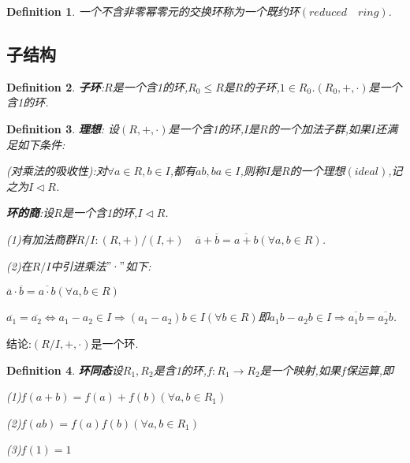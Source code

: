 \documentclass[UTF8]{article}
\newtheorem{defn}{Definition}[section]
\begin{document}
\begin{defn}
	一个不含非零幂零元的交换环称为一个既约环$(reduced\quad ring)$.
\end{defn}

\subsection{子结构}
\normalsize
\begin{defn}
	\textbf{子环}:$R$是一个含1的环,$R_0\leq R$是$R$的子环,$1\in R_0$.$(R_0,+,\cdot)$是一个含1的环.
\end{defn}


\begin{defn}
	\textbf{理想}:
	设$(R,+,\cdot)$是一个含1的环,$I$是$R$的一个加法子群,如果$I$还满足如下条件:
	
	(对乘法的吸收性):对$\forall a\in R,b\in I$,都有$ab,ba\in I$,则称$I$是$R$的一个理想$(ideal)$,记之为$I\lhd R$.
	
	\textbf{环的商}:设$R$是一个含1的环,$I\lhd R$.
	
	(1)有加法商群$R/I:(R,+)/(I,+)\quad \overline a+\overline b=\overline {a+b}(\forall a,b\in R)$.
	
	(2)在$R/I$中引进乘法$"\cdot"$如下:
	\begin{center}
		$\overline a\cdot \overline b=\overline {a\cdot b}(\forall a,b\in R)$
		
		$\overline{a_1}=\overline{a_2}\iff a_1-a_2\in I\Rightarrow (a_1-a_2)b\in I(\forall b\in R)$即$a_1b-a_2b\in I\Rightarrow\overline{a_1b}=\overline{a_2b}$.
		
	\end{center}
\end{defn}

结论:$(R/I,+,\cdot)$是一个环.


\begin{defn}
	\textbf{环同态}设$R_1,R_2$是含1的环,$f:R_1\rightarrow R_2$是一个映射,如果$f$保运算,即
	
	(1)$f(a+b)=f(a)+f(b)(\forall a,b\in R_1)$
	
	(2)$f(ab)=f(a)f(b)(\forall a,b\in R_1)$
	
	(3)$f(1)=1$
\end{defn}
\end{document}

